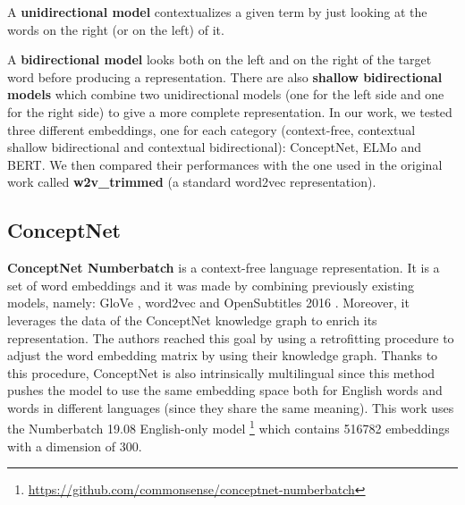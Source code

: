 \documentclass[11pt,a4paper]{article}
\begin{document}
A \textbf{unidirectional model} contextualizes a given term by just looking at the words on the right (or on the left) of it.  

A \textbf{bidirectional model} looks both on the left and on the right of the target word before producing a representation. There are also \textbf{shallow bidirectional models} which combine two unidirectional models (one for the left side and one for the right side) to give a more complete representation. In our work, we tested three different embeddings, one for each category (context-free, contextual shallow bidirectional and contextual bidirectional): ConceptNet, ELMo and BERT. We then compared their performances with the one used in the original work called \textbf{w2v\_trimmed} (a standard word2vec representation).

\subsection{ConceptNet}
\textbf{ConceptNet Numberbatch} \cite{speer2017conceptnet} is a context-free language representation. It is a set of word embeddings and it was made by combining previously existing models, namely: GloVe \cite{pennington2014glove}, word2vec \cite{mikolov2013efficient} and OpenSubtitles 2016 \cite{Lison2016OpenSubtitles2016EL}. Moreover, it leverages the data of the ConceptNet knowledge graph to enrich its representation. The authors reached this goal by using a retrofitting procedure to adjust the word embedding matrix by using their knowledge graph. Thanks to this procedure, ConceptNet is also intrinsically multilingual since this method pushes the model to use the same embedding space both for English words and words in different languages (since they share the same meaning).  This work uses the Numberbatch 19.08 English-only model \footnote{\url{https://github.com/commonsense/conceptnet-numberbatch}} which contains 516782 embeddings with a dimension of 300.
\end{document}
